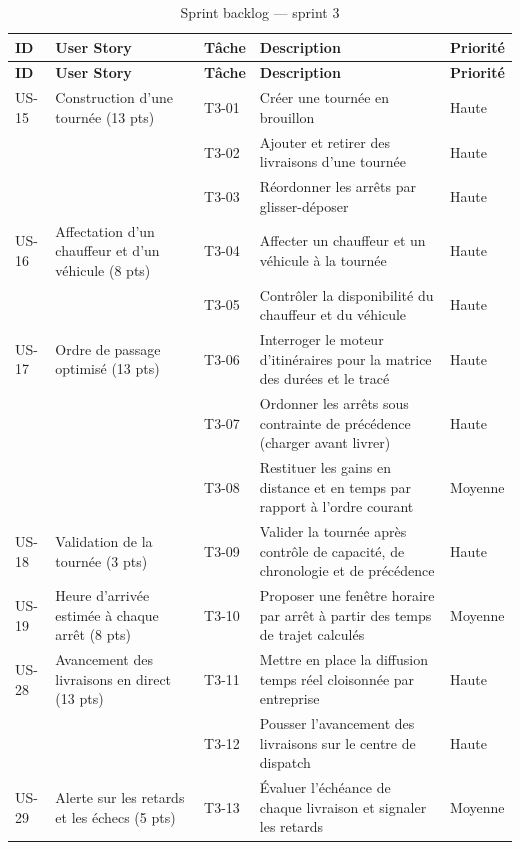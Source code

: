 \begin{small}
\begin{longtable}{L{1.1cm}L{3.0cm}L{1.2cm}L{7.0cm}L{1.4cm}}
\caption{Sprint backlog — sprint 3}\label{tab:backlog-s3}\\
\hline
{}
\textbf{ID} & \textbf{User Story} & \textbf{Tâche} & \textbf{Description} & \textbf{Priorité} \\
\hline
\endfirsthead
\hline
{}
\textbf{ID} & \textbf{User Story} & \textbf{Tâche} & \textbf{Description} & \textbf{Priorité} \\
\hline
\endhead
\hline
\endfoot

US-15 & Construction d'une tournée (13 pts) & T3-01 & Créer une tournée en brouillon & Haute \\
\hline
      &  & T3-02 & Ajouter et retirer des livraisons d'une tournée & Haute \\
\hline
      &  & T3-03 & Réordonner les arrêts par glisser-déposer & Haute \\
\hline
US-16 & Affectation d'un chauffeur et d'un véhicule (8 pts) & T3-04 & Affecter un chauffeur et un véhicule à la tournée & Haute \\
\hline
      &  & T3-05 & Contrôler la disponibilité du chauffeur et du véhicule & Haute \\
\hline
US-17 & Ordre de passage optimisé (13 pts) & T3-06 & Interroger le moteur d'itinéraires pour la matrice des durées et le tracé & Haute \\
\hline
      &  & T3-07 & Ordonner les arrêts sous contrainte de précédence (charger avant livrer) & Haute \\
\hline
      &  & T3-08 & Restituer les gains en distance et en temps par rapport à l'ordre courant & Moyenne \\
\hline
US-18 & Validation de la tournée (3 pts) & T3-09 & Valider la tournée après contrôle de capacité, de chronologie et de précédence & Haute \\
\hline
US-19 & Heure d'arrivée estimée à chaque arrêt (8 pts) & T3-10 & Proposer une fenêtre horaire par arrêt à partir des temps de trajet calculés & Moyenne \\
\hline
US-28 & Avancement des livraisons en direct (13 pts) & T3-11 & Mettre en place la diffusion temps réel cloisonnée par entreprise & Haute \\
\hline
      &  & T3-12 & Pousser l'avancement des livraisons sur le centre de dispatch & Haute \\
\hline
US-29 & Alerte sur les retards et les échecs (5 pts) & T3-13 & Évaluer l'échéance de chaque livraison et signaler les retards & Moyenne \\

\end{longtable}
\end{small}
